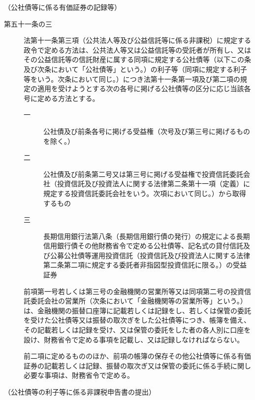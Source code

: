 \documentclass[twocolumn,a4j,10pt]{ltjtarticle}
\begin{document}
\noindent\hspace{10pt}（公社債等に係る有価証券の記録等）
\begin{description}
\item[第五十一条の三]法第十一条第三項（公共法人等及び公益信託等に係る非課税）に規定する政令で定める方法は、公共法人等又は公益信託等の受託者が所有し、又はその公益信託等の信託財産に属する同項に規定する公社債等（以下この条及び次条において「公社債等」という。）の利子等（同項に規定する利子等をいう。次条において同じ。）につき法第十一条第一項及び第二項の規定の適用を受けようとする次の各号に掲げる公社債等の区分に応じ当該各号に定める方法とする。
\begin{description}
\item[一]公社債及び前条各号に掲げる受益権（次号及び第三号に掲げるものを除く。）
\item[二]公社債及び前条第二号又は第三号に掲げる受益権で投資信託委託会社（投資信託及び投資法人に関する法律第二条第十一項（定義）に規定する投資信託委託会社をいう。次項において同じ。）から取得するもの
\item[三]長期信用銀行法第八条（長期信用銀行債の発行）の規定による長期信用銀行債その他財務省令で定める公社債等、記名式の貸付信託及び公募公社債等運用投資信託（投資信託及び投資法人に関する法律第二条第二項に規定する委託者非指図型投資信託に限る。）の受益証券
\end{description}
\item[]前項第一号若しくは第三号の金融機関の営業所等又は同項第二号の投資信託委託会社の営業所（次条において「金融機関等の営業所等」という。）は、金融機関の振替口座簿に記載若しくは記録をし、若しくは保管の委託を受けた公社債等又は振替の取次ぎをした公社債等につき、帳簿を備え、その記載若しくは記録を受け、又は保管の委託をした者の各人別に口座を設け、財務省令で定める事項を記載し、又は記録しなければならない。
\item[]前二項に定めるもののほか、前項の帳簿の保存その他公社債等に係る有価証券の記載若しくは記録、振替の取次ぎ又は保管の委託に係る手続に関し必要な事項は、財務省令で定める。
\end{description}
\noindent\hspace{10pt}（公社債等の利子等に係る非課税申告書の提出）
\end{document}
